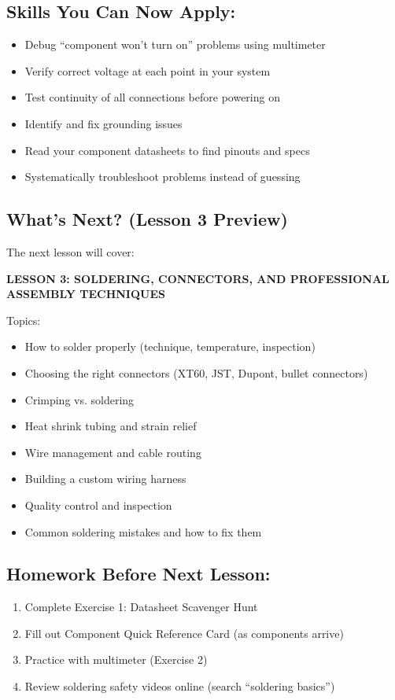 \documentclass[11pt,letterpaper]{article}
\begin{document}
\subsection*{Skills You Can Now Apply:}

\begin{itemize}
\item Debug ``component won't turn on'' problems using multimeter
\item Verify correct voltage at each point in your system
\item Test continuity of all connections before powering on
\item Identify and fix grounding issues
\item Read your component datasheets to find pinouts and specs
\item Systematically troubleshoot problems instead of guessing
\end{itemize}

\subsection*{What's Next? (Lesson 3 Preview)}

The next lesson will cover:

\textbf{LESSON 3: SOLDERING, CONNECTORS, AND PROFESSIONAL ASSEMBLY TECHNIQUES}

Topics:
\begin{itemize}
\item How to solder properly (technique, temperature, inspection)
\item Choosing the right connectors (XT60, JST, Dupont, bullet connectors)
\item Crimping vs. soldering
\item Heat shrink tubing and strain relief
\item Wire management and cable routing
\item Building a custom wiring harness
\item Quality control and inspection
\item Common soldering mistakes and how to fix them
\end{itemize}

\subsection*{Homework Before Next Lesson:}

\begin{enumerate}
\item Complete Exercise 1: Datasheet Scavenger Hunt
\item Fill out Component Quick Reference Card (as components arrive)
\item Practice with multimeter (Exercise 2)
\item Review soldering safety videos online (search ``soldering basics'')
\end{enumerate}
\end{document}
